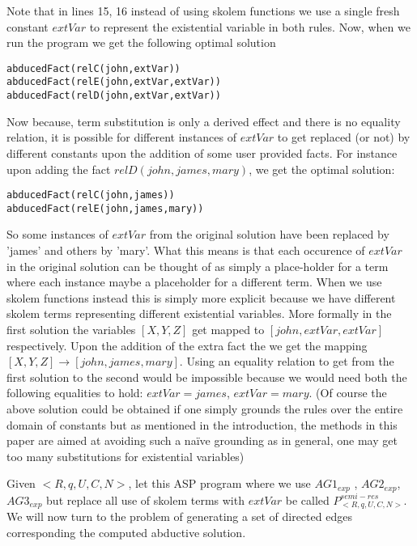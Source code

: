 Note that in lines 15, 16 instead of using skolem functions we use a single
fresh constant $extVar$ to represent the existential variable in both
rules. Now, when we run the program we get the following optimal solution

\begin{verbatim}
abducedFact(relC(john,extVar))
abducedFact(relE(john,extVar,extVar))
abducedFact(relD(john,extVar,extVar))    
\end{verbatim}

Now because, term substitution is only a derived effect and there is no
equality relation, it is possible for different instances of $extVar$ to get
replaced (or not) by different constants upon the addition of some user
provided facts. For instance upon adding the fact $relD(john,james,mary)$, we get
the optimal solution:

\begin{verbatim}
abducedFact(relC(john,james))
abducedFact(relE(john,james,mary))    
\end{verbatim}

So some instances of $extVar$ from the original solution have been replaced by 'james' and others by 'mary'. What this means is that each occurence of $extVar$ in the original solution can be thought of as simply a place-holder for a term where each instance maybe a placeholder for a different term. When we use skolem functions instead this is simply more explicit because we have different skolem terms representing different existential variables. More formally in the first solution the variables $[X,Y,Z]$ get mapped to $[john, extVar,extVar]$ respectively. Upon the addition of the extra fact the we get the mapping $[X,Y,Z]\rightarrow[john,james,mary]$. Using an equality relation to get from the first solution to the second would be impossible because we would need both the following equalities to hold: $extVar = james$, $extVar = mary$. (Of course the above solution could be obtained if one simply grounds the rules over the entire domain of constants but as mentioned in the introduction, the methods in this paper are aimed at avoiding such a naïve grounding as in general, one may get too many substitutions for existential variables)


Given $<R,q,U,C,N>$, let this ASP program where we use $AG1_{exp}$ , $AG2_{exp}$, $AG3_{exp}$ but replace all use of skolem terms with $extVar$ be called $P_{<R,q,U,C,N>}^{semi-res}$.\\ We will now turn to the problem of generating a set of directed edges corresponding the computed abductive solution.



